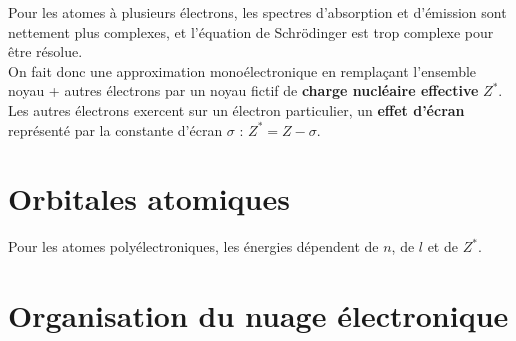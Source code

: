 \documentclass[13pt, twoside, a4paper, french, tikz]{report}
\begin{document}
    Pour les atomes à plusieurs électrons, les spectres d'absorption et d'émission sont nettement plus complexes, et l'équation de Schrödinger est trop complexe pour être résolue.\\

    On fait donc une approximation monoélectronique en remplaçant l'ensemble {noyau + autres électrons} par un noyau fictif de \textbf{charge nucléaire effective} $Z^*$.\\
    Les autres électrons exercent sur un électron particulier, un \textbf{effet d'écran} représenté par la constante d'écran $\sigma$ : $Z^* = Z - \sigma$.


    \section{Orbitales atomiques}\label{sec:orbitales-atomiques}

    Pour les atomes polyélectroniques, les énergies dépendent de $n$, de $l$ et de $Z^*$.


    \section{Organisation du nuage électronique}\label{sec:organisation-du-nuage-electronique}
\end{document}
